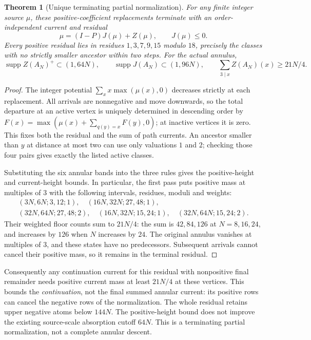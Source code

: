 \documentclass[11pt]{article}
\newtheorem{theorem}{Theorem}
\newcommand{\supp}{\operatorname{supp}}
\begin{document}
\begin{theorem}[Unique terminating partial normalization]\label{thm:auxnormal}
For any finite integer source $\mu$, these positive-coefficient
replacements terminate with an order-independent current and residual
\[
 \mu=(I-P)J(\mu)+Z(\mu),\qquad J(\mu)\le0.
\]
Every positive residual lies in residues $1,3,7,9,15$ modulo $18$,
precisely the classes with no strictly smaller ancestor within two steps.
For the actual annulus,
\[
 \supp Z(A_N)^+\subset(1,64N),\qquad
 \supp J(A_N)\subset(1,96N),\qquad
 \sum_{3\mid x}Z(A_N)(x)\ge21N/4.
\]
\end{theorem}
\begin{proof}
The integer potential $\sum_x x\max(\mu(x),0)$ decreases strictly at each
replacement. All arrivals are nonnegative and move downwards, so the
total departure at an active vertex is uniquely determined in descending
order by
$F(x)=\max(\mu(x)+\sum_{q(y)=x}F(y),0)$; at inactive vertices it is zero.
This fixes both the residual and the sum of path currents.
An ancestor smaller than $y$ at distance at most two can use only
valuations $1$ and $2$; checking those four pairs gives exactly the
listed active classes.

Substituting the six annular bands into the three rules gives the
positive-height and current-height bounds. In particular, the first
pass puts positive mass at multiples of $3$ with the following intervals,
residues, moduli and weights:
\[
 \begin{gathered}
 (3N,6N;3,12;1),\quad (16N,32N;27,48;1),\\
 (32N,64N;27,48;2),\quad (16N,32N;15,24;1),\quad
 (32N,64N;15,24;2).
 \end{gathered}
\]
Their weighted floor counts sum to $21N/4$: the sum is $42,84,126$
at $N=8,16,24$, and increases by $126$ when $N$ increases by $24$.
The original annulus vanishes at multiples of $3$, and these states
have no predecessors. Subsequent arrivals cannot cancel their positive
mass, so it remains in the terminal residual.
\end{proof}

Consequently any continuation current for this residual with nonpositive
final remainder needs positive current mass at least $21N/4$ at these
vertices. This bounds the \emph{continuation}, not the final summed
annular current: its positive rows can cancel the negative rows of the
normalization. The whole residual retains upper negative atoms below
$144N$. The positive-height bound does not improve the existing
source-scale absorption cutoff $64N$. This is a terminating partial
normalization, not a complete annular descent.
\end{document}

